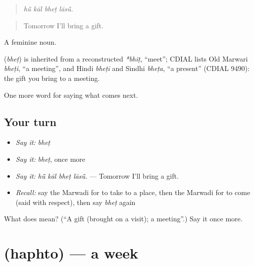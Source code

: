 \begin{quote}
   
\end{quote}

\begin{quote}
\emph{hū̃ kāl bheṭ lāsū̃.}
\end{quote}

\begin{quote}
Tomorrow I'll bring a gift.
\end{quote}

A feminine noun.

\begin{cousinweb}
\textbf{} (\emph{bheṭ}) is inherited from a reconstructed \emph{*bhiṭ}, \textquotedblleft{}meet\textquotedblright{}; CDIAL lists Old Marwari \emph{bheṭi}, \textquotedblleft{}a meeting\textquotedblright{}, and Hindi \emph{bheṭī} and Sindhi \emph{bheṭa}, \textquotedblleft{}a present\textquotedblright{} (CDIAL 9490): the gift you bring to a meeting.
\end{cousinweb}

\begin{grammarlens}[title={What you've built}]
One more word for saying what comes next.
\end{grammarlens}

\subsection*{Your turn}
\begin{itemize}
\raggedright
  \item \emph{Say it:} \emph{bheṭ}
  \item \emph{Say it:} \emph{bheṭ}, once more
  \item \emph{Say it:} \emph{hū̃ kāl bheṭ lāsū̃.} — Tomorrow I'll bring a gift.
  \item \emph{Recall:} say the Marwadi for to take to a place, then the Marwadi for to come (said with respect), then say \emph{bheṭ} again
\end{itemize}

\begin{tcolorbox}[breakable,colback=teal!4,colframe=teal!35!black,title={Before you move on}]
What does  mean? (\textquotedblleft{}A gift (brought on a visit); a meeting\textquotedblright{}.) Say it once more.
\end{tcolorbox}
\section[\texorpdfstring{\mw{हफ्तो} (haphto)}{हफ्तो (haphto)}]{ (haphto) — a week}

